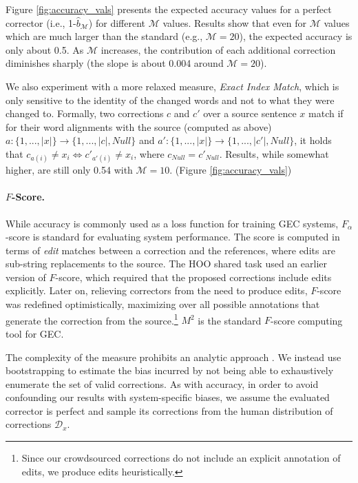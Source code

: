 \documentclass[letterpaper, 11pt]{article}
\newcommand{\lc}[1]{\footnote{\color{blue}LC: #1}}
\begin{document}
Figure \ref{fig:accuracy_vals} presents the expected accuracy values for a perfect
corrector (i.e., 1-$\hat{b}_\mathcal{M}$) for different  $\mathcal{M}$ values. 
Results show that even for $\mathcal{M}$ values which are much larger than the standard (e.g., $\mathcal{M}=20$),
the expected accuracy is only about 0.5. As $\mathcal{M}$ increases, the contribution of each additional correction 
diminishes sharply (the slope is about 0.004 around $\mathcal{M}=20$).

We also experiment with a more relaxed measure, {\it Exact Index Match}, which is only sensitive to the identity of the changed words and not to what they were changed to. 
Formally, two corrections $c$ and $c'$ over a source sentence $x$ match if for their word alignments with the source (computed as above) $a:\{1,...,\left|x\right|\} \rightarrow \{1,...,\left|c\right|,Null\}$
and $a':\{1,...,\left|x\right|\} \rightarrow \{1,...,\left|c'\right|,Null\}$, it holds that $c_{a\left(i\right)} \neq x_{i} \Leftrightarrow c'_{a'\left(i\right)} \neq x_{i}$, where $c_{Null}=c'_{Null}$.
Results, while somewhat higher, are still only 0.54 with $\mathcal{M}=10$. (Figure \ref{fig:accuracy_vals})


\paragraph{$F$-Score.}
While accuracy is commonly used as a loss function for training GEC systems,
$F_\alpha$-score is standard for evaluating system performance.%
The score is computed in terms of {\it edit} matches between a correction and the references, where edits are sub-string replacements to the source.
The HOO shared task used an earlier version of $F$-score, which required that the proposed corrections include edits explicitly.
Later on, relieving correctors from the need to produce edits, $F$-score was redefined optimistically, maximizing over all possible annotations that generate the correction from the source.\footnote{Since our crowdsourced corrections
	do not include an explicit annotation of edits, we produce edits heuristically.}
$M^2$ \cite{dahlmeier2012better} is the standard $F$-score computing tool for GEC.

The complexity of the measure prohibits an analytic approach \cite{yeh2000more}.
We instead use bootstrapping to estimate the bias incurred by not being able to exhaustively enumerate the set of valid corrections.
As with accuracy, in order to avoid confounding our results with system-specific biases,
we assume the evaluated corrector is perfect and sample its corrections from the human distribution of corrections $\mathcal{D}_x$.
\end{document}
